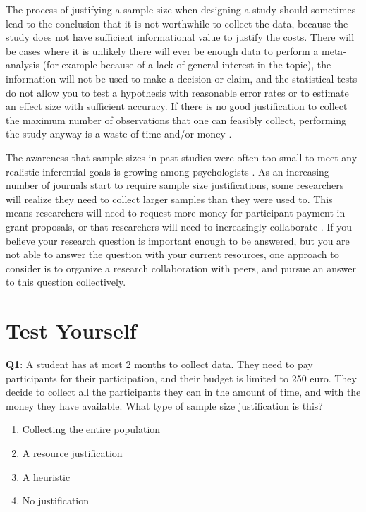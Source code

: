 \documentclass[
  oneside]{krantz}
\providecommand{\tightlist}{%
  \setlength{\itemsep}{0pt}\setlength{\parskip}{0pt}}
\begin{document}
The process of justifying a sample size when designing a study should sometimes lead to the conclusion that it is not worthwhile to collect the data, because the study does not have sufficient informational value to justify the costs. There will be cases where it is unlikely there will ever be enough data to perform a meta-analysis (for example because of a lack of general interest in the topic), the information will not be used to make a decision or claim, and the statistical tests do not allow you to test a hypothesis with reasonable error rates or to estimate an effect size with sufficient accuracy. If there is no good justification to collect the maximum number of observations that one can feasibly collect, performing the study anyway is a waste of time and/or money \citep{button_power_2013, brown_errors_1983, halpern_continuing_2002}.

The awareness that sample sizes in past studies were often too small to meet any realistic inferential goals is growing among psychologists \citep{lindsay_replication_2015, sedlmeier_studies_1989, fraley_n-pact_2014, button_power_2013}. As an increasing number of journals start to require sample size justifications, some researchers will realize they need to collect larger samples than they were used to. This means researchers will need to request more money for participant payment in grant proposals, or that researchers will need to increasingly collaborate \citep{moshontz_psychological_2018}. If you believe your research question is important enough to be answered, but you are not able to answer the question with your current resources, one approach to consider is to organize a research collaboration with peers, and pursue an answer to this question collectively.

\hypertarget{test-yourself-6}{%
\section{Test Yourself}\label{test-yourself-6}}

\textbf{Q1}: A student has at most 2 months to collect data. They need to pay participants for their participation, and their budget is limited to 250 euro. They decide to collect all the participants they can in the amount of time, and with the money they have available. What type of sample size justification is this?

\begin{enumerate}
\def\labelenumi{\Alph{enumi})}
\tightlist
\item
  Collecting the entire population
\item
  A resource justification
\item
  A heuristic
\item
  No justification
\end{enumerate}
\end{document}
